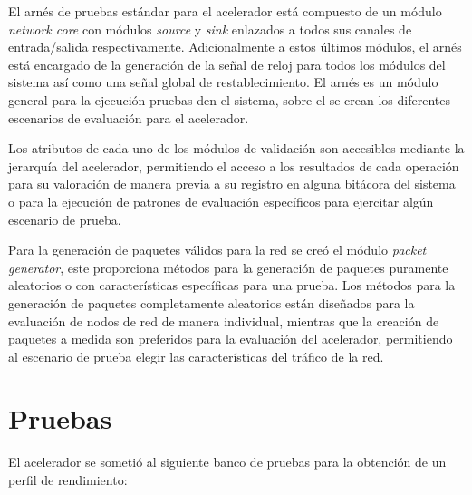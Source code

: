 El arnés de pruebas estándar para el acelerador está compuesto de un módulo \textit{network core} con módulos \textit{source} y \textit{sink} enlazados a todos sus canales de entrada/salida respectivamente. Adicionalmente a estos últimos módulos, el arnés está encargado de la generación de la señal de reloj para todos los módulos del sistema así como una señal global de restablecimiento. El arnés es un módulo general para la ejecución pruebas den el sistema, sobre el se crean los diferentes escenarios de evaluación para el acelerador.

Los atributos de cada uno de los módulos de validación son accesibles mediante la jerarquía del acelerador, permitiendo el acceso a los resultados de cada operación para su valoración de manera previa a su registro en alguna bitácora del sistema o para la ejecución de patrones de evaluación específicos para ejercitar algún escenario de prueba.

Para la generación de paquetes válidos para la red se creó el módulo \textit{packet generator}, este proporciona métodos para la generación de paquetes puramente aleatorios o con características específicas para una prueba. Los métodos para la generación de paquetes completamente aleatorios están diseñados para la evaluación de nodos de red de manera individual, mientras que la creación de paquetes a medida son preferidos para la evaluación del acelerador, permitiendo al escenario de prueba elegir las características del tráfico de la red.

 \section{Pruebas}
	\label{ch5_pruebas}

El acelerador se sometió al siguiente banco de pruebas para la obtención de un perfil de rendimiento:

